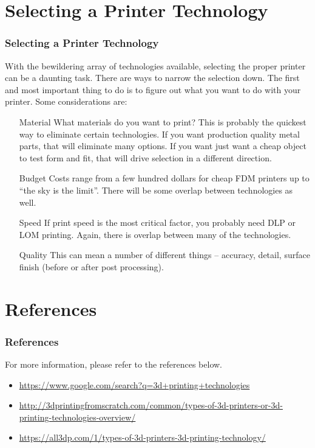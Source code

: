 \documentclass[english,10pt]{beamer}
\begin{document}
\section{Selecting a Printer Technology}
\begin{frame}
  \frametitle{Selecting a Printer Technology}
  With the bewildering array of technologies available, selecting the proper printer can be a daunting task.  There are ways to narrow the selection down.  The first and most important thing to do is to figure out what you want to do with your printer.  Some considerations are:
  \begin{itemize}
    \item [Material] What materials do you want to print?  This is probably the quickest way to eliminate certain technologies.  If you want production quality metal parts, that will eliminate many options.  If you want just want a cheap object to test form and fit, that will drive selection in a different direction.
    \item [Budget] Costs range from a few hundred dollars for cheap FDM printers up to ``the sky is the limit''.  There will be some overlap between technologies as well.
    \item [Speed] If print speed is the most critical factor, you probably need DLP or LOM printing.  Again, there is overlap between many of the technologies.
    \item [Quality] This can mean a number of different things -- accuracy, detail, surface finish (before or after post processing).
  \end{itemize}
\end{frame}

\section{References}
\begin{frame}
  \frametitle{References}
  For more information, please refer to the references below.
  \begin{itemize}
    \item \url{https://www.google.com/search?q=3d+printing+technologies}
    \item \url{http://3dprintingfromscratch.com/common/types-of-3d-printers-or-3d-printing-technologies-overview/}
    \item \url{https://all3dp.com/1/types-of-3d-printers-3d-printing-technology/}
  \end{itemize}
\end{frame}
\end{document}
